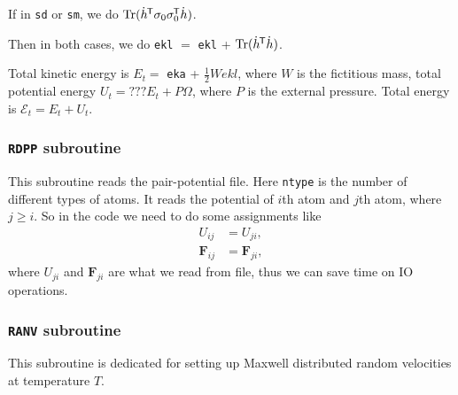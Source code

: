 If in \texttt{sd} or \texttt{sm}, we do 
$\operatorname{Tr}(\dot{h}^{\mkern-1.5mu\mathsf{T}} \sigma_0 \sigma_0^{\mkern-1.5mu\mathsf{T}} \dot{ h })$.

Then in both cases, we do
\texttt{ekl} $=$ \texttt{ekl} + $\operatorname{Tr} (\dot{ h }^{\mkern-1.5mu\mathsf{T}} \dot{ h })$.

Total kinetic energy is $E_{t} = $ \texttt{eka} + $\frac{ 1 }{ 2 } W ekl$,
where $W$ is the fictitious mass,
total potential energy $U_{t} = ???E_{t} + P \Omega$, where $P$ is the external pressure.
Total energy is $\mathscr{E}_{t} = E_t + U_{t}$.


\subsubsection{\texttt{RDPP} subroutine}

This subroutine reads the pair-potential file.
Here \texttt{ntype} is the number of different types of atoms.
It reads the potential of $i$th atom and $j$th atom, where $j \geq i$.
So in the code we need to do some assignments like
\begin{align}
	U_{ij}      & = U_{ji},      \\
	\bm{F}_{ij} & = \bm{F}_{ji}, 
\end{align}
where $U_{ji}$ and $\bm{F}_{ji}$ are what we read from file,
thus we can save time on IO operations.


\subsubsection{\texttt{RANV} subroutine}

This subroutine is dedicated for setting up Maxwell distributed random velocities
at temperature $T$.


